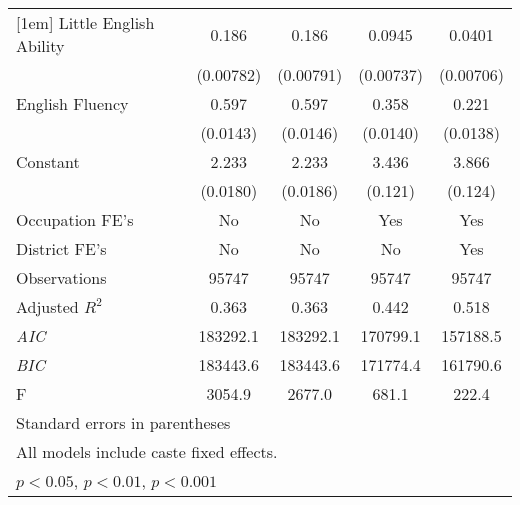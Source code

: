 \begin{table}[htbp]
\begin{tabular}{l*{4}{c}}
[1em]
Little English Ability&    0.186\sym{***}&    0.186\sym{***}&   0.0945\sym{***}&   0.0401\sym{***}\\
                &(0.00782)         &(0.00791)         &(0.00737)         &(0.00706)         \\
[1em]
English Fluency &    0.597\sym{***}&    0.597\sym{***}&    0.358\sym{***}&    0.221\sym{***}\\
                & (0.0143)         & (0.0146)         & (0.0140)         & (0.0138)         \\
[1em]
Constant        &    2.233\sym{***}&    2.233\sym{***}&    3.436\sym{***}&    3.866\sym{***}\\
                & (0.0180)         & (0.0186)         &  (0.121)         &  (0.124)         \\
[1em]
Occupation FE's &       No         &       No         &      Yes         &      Yes         \\
[1em]
District FE's   &       No         &       No         &       No         &      Yes         \\
\hline
Observations    &    95747         &    95747         &    95747         &    95747         \\
Adjusted \(R^{2}\)&    0.363         &    0.363         &    0.442         &    0.518         \\
\textit{AIC}    & 183292.1         & 183292.1         & 170799.1         & 157188.5         \\
\textit{BIC}    & 183443.6         & 183443.6         & 171774.4         & 161790.6         \\
F               &   3054.9         &   2677.0         &    681.1         &    222.4         \\
\hline\hline
\multicolumn{5}{l}{\footnotesize Standard errors in parentheses}\\
\multicolumn{5}{l}{\footnotesize All models include caste fixed effects.}\\
\multicolumn{5}{l}{\footnotesize \sym{*} \(p<0.05\), \sym{**} \(p<0.01\), \sym{***} \(p<0.001\)}\\
\end{tabular}
\end{table}
